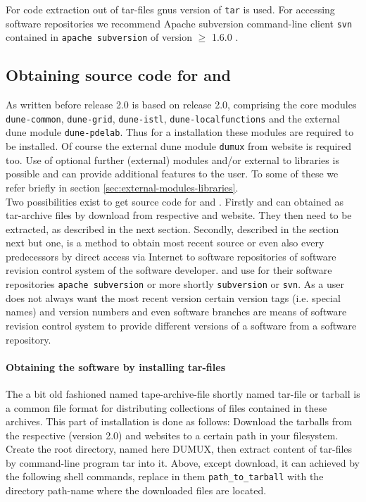 For code extraction out of tar-files gnus version of \texttt{tar} is used.
For accessing software repositories we recommend Apache subversion command-line client \texttt{svn}
contained in \texttt{apache subversion} of version $\geqslant$ 1.6.0 \cite{APACHE-SUBVERSION-HP}. 

\subsection{Obtaining source code for \Dune and \Dumux}
As written before \Dumux release 2.0 is based on \Dune release 2.0, comprising the core modules 
\texttt{dune-common}, \texttt{dune-grid}, \texttt{dune-istl}, \texttt{dune-localfunctions} and the external dune
module \texttt{dune-pdelab}. Thus for a \Dumux installation these modules are required to be installed.
Of course the external dune module \texttt{dumux} from \Dumux website is required too.
Use of optional further (external) \Dune modules  and/or external to \Dune libraries is possible and can provide additional features to the user. To some of these we refer briefly in section \ref{sec:external-modules-libraries}.\\

Two possibilities exist to get source code for \Dune and \Dumux.
Firstly \Dune and \Dumux can obtained as tar-archive files by download from respective {\Dune} and {\Dumux} website. They then need to be extracted, as described in the next section.
Secondly, described in the section next but one, is a method to obtain most recent source or even also every predecessors by direct access via Internet to software repositories of software revision control system of the software developer. \Dune and \Dumux use for their software repositories \texttt{apache subversion} or more shortly \texttt{subversion} or \texttt{svn}.
As a user does not always want the most recent version
certain version tags (i.e. special names) and version numbers and even software branches are means of software revision control system to provide different versions of a software from a software repository.

\paragraph{Obtaining the software by installing tar-files}
The a bit old fashioned named tape-archive-file shortly named tar-file or tarball is a common file format for distributing collections of files contained in these archives.
This part of installation is done as follows: 
Download the tarballs from the respective \Dune (version 2.0) and \Dumux websites to a certain path in your filesystem.
Create the {\Dune} root directory, named here DUMUX, then extract content of tar-files by command-line program tar into it.
Above, except download, it can achieved by the following shell commands, replace in them \texttt{path\_to\_tarball} with the directory path-name where the downloaded files are located.


